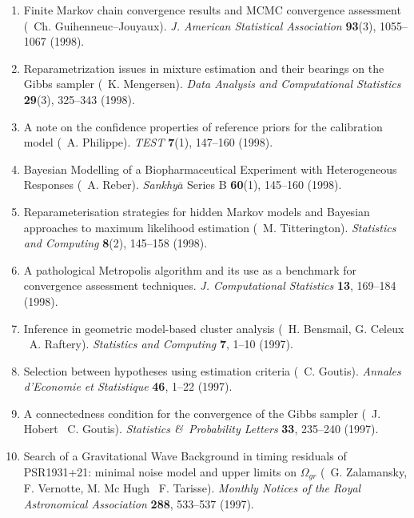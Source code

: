 \begin{enumerate}
\item Finite Markov chain convergence results and MCMC
convergence assessment (\avec\ Ch. Guihenneuc--Jou\-y\-aux).
{\it J. American Statistical Association} {\bf 93}(3), 1055--1067 (1998). 

\item Reparametrization issues in mixture estimation and their bearings on the
Gibbs sampler (\avec\  K. Mengersen).
{\it Data Analysis and Computational Statistics} {\bf 29}(3), 325--343 (1998).

\item A note on the confidence properties of reference priors for 
the calibration model (\avec\  A. Philippe).
{\it TEST} {\bf 7}(1), 147--160 (1998). 

\item Bayesian Modelling of a Biopharmaceutical Experiment with Heterogeneous 
Res\-pon\-ses (\avec\  A. Reber).  {\it Sankhy$\bar a$} Series B {\bf 60}(1), 145--160 (1998).

\item Reparameterisation strategies for hidden Markov models and
Bayesian approaches to maximum likelihood estimation (\avec\ M. Titterington).
{\it Statistics and Computing} {\bf 8}(2), 145--158 (1998).

\item A pathological Metropolis algorithm and its use as a
benchmark for convergence assessment techniques. 
{\it J. Computational Statistics} {\bf 13}, 169--184 (1998).

\item Inference in geometric model-based cluster analysis
(\avec\  H. Bensmail, G. Celeux \et\  A. Raftery).
{\it Statistics and Computing} {\bf 7}, 1--10 (1997).

\item Selection between hypotheses using estimation criteria
(\avec\  C. Goutis). {\it Annales d'Economie et Statistique} 
{\bf 46}, 1--22 (1997). 

\item A connectedness condition for the convergence of the Gibbs sampler
(\avec\ J. Hobert \et\ C. Goutis).
{\it Statistics \&\ Probability Letters} {\bf 33}, 235--240 (1997).

\item Search of a Gravitational Wave Background in timing residuals
of PSR1931+21: minimal noise model and upper limits on $\Omega_{gr}$ (\avec\
G. Zalamansky, F. Vernotte, M. Mc Hugh \et\ F. Tarisse). 
{\it Monthly Notices of the Royal Astronomical Association} {\bf 288}, 
533--537 (1997).


\end{enumerate}
